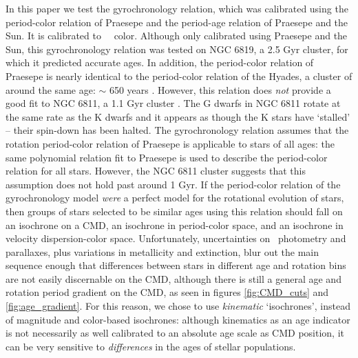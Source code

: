 
In this paper we test the \citet{angus2019} gyrochronology relation, which
was calibrated using the period-color relation of Praesepe and the period-age
relation of Praesepe and the Sun.
It is calibrated to \gaia\ \gcolor\ color.
Although only calibrated using Praesepe and the Sun, this gyrochronology
relation was tested on NGC 6819, a 2.5 Gyr cluster, for which it predicted
accurate ages.
In addition, the period-color relation of Praesepe is nearly identical to the
period-color relation of the Hyades, a cluster of around the same age: $\sim$
650 years \citep{douglas2019}.
However, this relation does {\it not} provide a good fit to NGC 6811, a 1.1
Gyr cluster \citep{curtis2019}.
The G dwarfs in NGC 6811 rotate at the same rate as the K dwarfs and it
appears as though the K stars have `stalled' -- their spin-down has been
halted.
The \citet{angus2019} gyrochronology relation assumes that the rotation
period-color relation of Praesepe is applicable to stars of all ages: the same
polynomial relation fit to Praesepe is used to describe the period-color
relation for all stars.
However, the NGC 6811 cluster suggests that this assumption does not hold past
around 1 Gyr.
If the period-color relation of the \citet{angus2019} gyrochronology model
{\it were} a perfect model for the rotational evolution of stars, then groups
of stars selected to be similar ages using this relation should fall on an
isochrone on a CMD, an isochrone in period-color space, and an
isochrone in velocity dispersion-color space.
Unfortunately, uncertainties on \gaia\ photometry and parallaxes, plus
variations in metallicity and extinction, blur out the main sequence enough
that differences between stars in different age and rotation bins are not
easily discernable on the CMD, although there is still a general age and
rotation period gradient on the CMD, as seen in figures \ref{fig:CMD_cuts} and
\ref{fig:age_gradient}.
For this reason, we chose to use {\it kinematic} `isochrones', instead of
magnitude and color-based isochrones: although kinematics as an age indicator
is not necessarily as well calibrated to an absolute age scale as CMD
position, it can be very sensitive to {\it differences} in the ages of stellar
populations.


